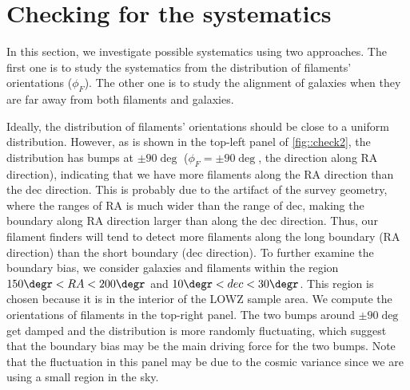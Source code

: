 \documentclass[usenatbib,useAMS]{mnras}
\theoremstyle{remark}
\begin{document}
{{{{{\section{Checking for the systematics}	\label{sec::system}


In this section, we investigate possible systematics using two approaches.
The first one is to study the systematics from the distribution of filaments' orientations ($\phi_F$).
The other one is to study the alignment of galaxies when they are far away from both filaments and galaxies.

Ideally, the distribution of filaments' orientations should be close to a uniform distribution.
However, as is shown in the top-left panel of \autoref{fig::check2}, 
the distribution has bumps at $\pm 90\deg$ ($\phi_F = \pm 90\deg$, the direction along RA direction), 
indicating that
we have more filaments along the RA direction than the dec direction. 
This is probably due to 
the artifact of the survey geometry, where 
the ranges of RA is much wider than the range of dec,
making the boundary along RA direction larger than along the dec direction.
Thus, our filament finders will tend to detect more filaments along the long boundary (RA direction)
than the short boundary (dec direction). 
{To further examine the boundary bias, we consider galaxies and filaments within the region $150\degr<RA<200\degr$ and 
$10\degr<dec<30\degr$. This region is chosen because it is in the interior of the LOWZ sample area.
We compute the orientations of filaments in the top-right panel.
The two bumps around $\pm 90\deg$ get damped and the distribution
is more randomly fluctuating, which suggest that the boundary bias may be 
the main driving force for the two bumps. 
Note that the fluctuation in this panel may be due to the cosmic variance since we 
are using a small region in the sky.
}


}}}}}
\end{document}
